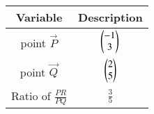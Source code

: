 \begin{tabular}[12pt]{ |c| c|}
\hline
\textbf{Variable} & \textbf{Description}\\
\hline
point $\vec{P}$ & $\begin{pmatrix}-1 \\ 3\end{pmatrix}$ \\
\hline 
point $\vec{Q}$ & $\begin{pmatrix}2 \\ 5\end{pmatrix}$\\
\hline
Ratio of $\frac{PR}{PQ}$ & $\frac{3}{5}$\\
\hline   
\end{tabular}

